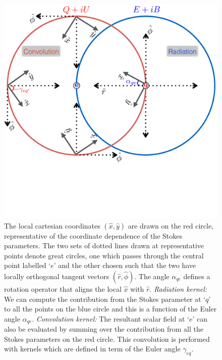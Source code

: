 \documentclass[a4paper,11pt]{article}
\begin{document}
%
\begin{figure}[!t]
\centering
\includegraphics[width=0.5\columnwidth]{radiation_convolution.pdf}
\caption{The local cartesian coordinates $(\hat{x},\hat{y})$ are drawn on the red circle, representative of the coordinate dependence of the Stokes parameters. The two sets of dotted lines drawn at representative points denote great circles, one which passes through the central point labelled `$e$' and the other chosen such that the two have locally orthogonal tangent vectors $(\hat{r},\hat{\phi})$. The angle $\alpha_{qe}$ defines a rotation operator that aligns the local $\hat{x}$ with $\hat{r}$.   \textit{Radiation kernel:} We can compute the contribution from the Stokes parameter at `$q$' to all the points on the blue circle and this is a function of the Euler angle $\alpha_{qe}$. \textit{Convolution kernel:} The resultant scalar field at `$e$' can also be evaluated by summing over the contribution from all the Stokes parameters on the red circle. This convolution is performed with kernels which are defined in term of the Euler angle $\gamma_{eq}$.}
\label{fig:planar_euler_angles}
\end{figure}
%
\end{document}
